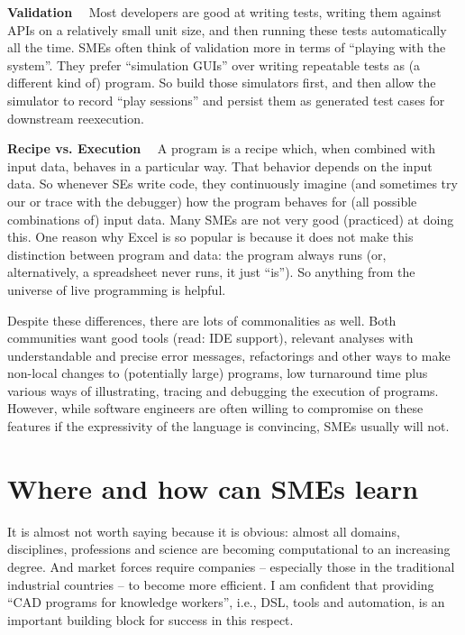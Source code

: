 \documentclass[runningheads]{llncs}
\newcommand\parhead[1]{\vspace{1mm}\noindent\textbf{{#1}}\ \ }
\begin{document}
\parhead{Validation} Most developers are good at writing tests, writing
them against APIs on a relatively small unit size, and then running these
tests automatically all the time. SMEs often think of validation more in
terms of ``playing with the system''. They prefer ``simulation GUIs'' over
writing repeatable tests as (a different kind of) program. So build those
simulators first, and then allow the simulator to record ``play sessions''
and persist them as generated test cases for downstream reexecution.

\parhead{Recipe vs. Execution} A program is a recipe which, when combined
with input data, behaves in a particular way. That behavior depends on the
input data. So whenever SEs write code, they continuously imagine (and sometimes
try our or trace with the debugger) how the program behaves for (all possible
combinations of) input data. Many SMEs are not very good (practiced) at doing
this. One reason why Excel is so popular is because it does not make this
distinction between program and data: the program always runs (or, alternatively,
a spreadsheet never runs, it just ``is''). So anything from the universe of
live programming is helpful.

\vspace{3mm}
\noindent Despite these differences, there are lots of commonalities as well.
Both communities want good tools (read: IDE support), relevant analyses with
understandable and precise error messages, refactorings and other ways to make
non-local changes to (potentially large) programs, low turnaround time plus
various ways of illustrating, tracing and debugging the execution of programs.  
However, while software engineers are often willing to compromise on these
features if the expressivity of the language is convincing, SMEs usually will 
not.

\section{Where and how can SMEs learn}

It is almost not worth saying because it is obvious: almost all domains,
disciplines, professions and science are becoming computational to an 
increasing degree. And market forces require companies -- especially those
in the traditional industrial countries -- to become more efficient. I
am confident that providing ``CAD programs for knowledge workers'', i.e.,
DSL, tools and automation, is an important building block for success in
this respect. 
\end{document}
